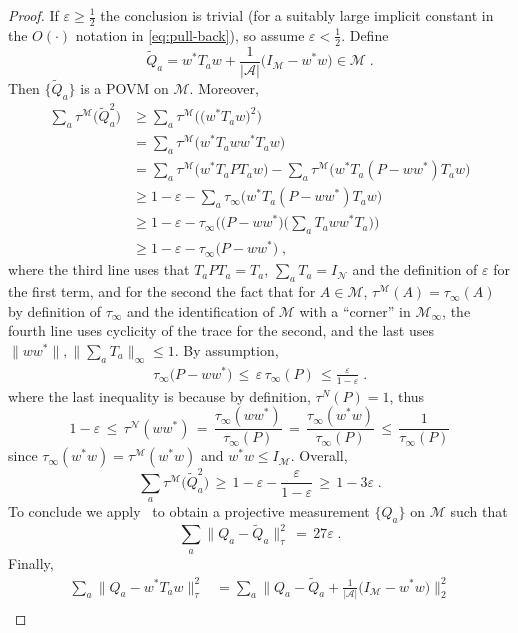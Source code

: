 \documentclass[11pt]{article}
\theoremstyle{definition}
\newcommand{\Id}{\ensuremath{I}}
\newcommand{\mA}{\ensuremath{\mathcal{A}}}
\newcommand{\mM}{\ensuremath{\mathcal{M}}}
\newcommand{\eps}{\varepsilon}
\newcommand{\mN}{\mathcal{N}}
\begin{document}
\begin{proof}
If $\eps\geq \frac{1}{2}$ the conclusion is trivial (for a suitably large implicit constant in the $O(\cdot)$ notation in \eqref{eq:pull-back}), so assume $\eps<\frac{1}{2}$. 
Define 
\[\tilde{Q}_a = w^* T_a w  + \frac{1}{|\mA|}\big(\Id_\mM - w^* w\big) \in \mM\;.\]
Then $\{\tilde{Q}_a\}$ is a POVM on $\mM$. Moreover, 
\begin{align*}
\sum_a \tau^\mM \big( \tilde{Q}_a^2 \big) &\geq \sum_a \tau^\mM \big( \big(w^* T_a w \big)^2 \big) \\
&= \sum_a \tau^\mM \big(  w^* T_a w w^*T_a w \big)\\
&= \sum_a \tau^\mM \big(  w^* T_a  P T_a w \big) - \sum_a \tau^\mM \big( w^* T_a  ( P - w w^*) T_a w \big)\\
&\geq 1 - \eps -  \sum_a \tau_\infty \big( w^* T_a  ( P - w w^*) T_a w \big)\\
&\geq 1 - \eps -  \tau_\infty\Big(\big( P - w w^*\big)\Big(\sum_a  T_a w w^* T_a\Big)\Big)\\ 
&\geq 1- \eps- \tau_\infty\big( P- w w^*\big)\;,
\end{align*}
where the third line uses that $T_aPT_a=T_a$, $\sum_a T_a = \Id_\mN$ and the definition of $\eps$ for the first term, and for the second the fact that for $A\in\mM$, $\tau^\mM(A)=\tau_\infty(A)$ by definition of $\tau_\infty$ and the identification of $\mM$ with a ``corner'' in $\mM_\infty$, the fourth line uses cyclicity of the trace for the second, and the last uses $\|ww^*\|,\|\sum_a T_a\|_\infty\leq 1$. By assumption, 
\begin{align*}
\tau_\infty\big( P- w w^*\big) \,\leq\, \eps\, \tau_\infty(P)\,\leq \frac{\eps}{1-\eps}\;.
\end{align*}
where the last inequality is because by definition, $\tau^N(P)=1$, thus
\[1-\eps \,\leq\, \tau^\mN(ww^*) \,=\, \frac{\tau_\infty(ww^*)}{\tau_\infty(P)}\,=\, \frac{\tau_\infty(w^*w)}{\tau_\infty(P)}  \,\leq\, \frac{1}{\tau_\infty(P)}\]
since $\tau_\infty(w^* w) = \tau^\mM(w^* w)$ and $w^*w\leq I_\mM$. Overall, 
\[ \sum_a \tau^\mM \big( \tilde{Q}_a^2 \big) \,\geq\, 1-\eps-\frac{\eps}{1-\eps}\,\geq\, 1-3\eps\;.\]
To conclude we apply~\cite[Theorem 1.2]{de2021orthogonalization} to obtain a projective measurement $\{Q_a\}$ on $\mM$ such that 
\begin{equation*}
\sum_a \big\|{Q}_a - \tilde{Q}_a \big\|^2_\tau \,=\, 27\eps\;.
\end{equation*}
Finally,
\begin{align*}
\sum_a \big\|{Q}_a - w^*{T}_a w\big\|^2_\tau &= \sum_a \Big\|{Q}_a - \tilde{Q}_a  + \frac{1}{|\mA|}\big(I_\mM - w^* w\big) \Big\|^2_2\\

\end{align*}
\end{proof}
\end{document}
